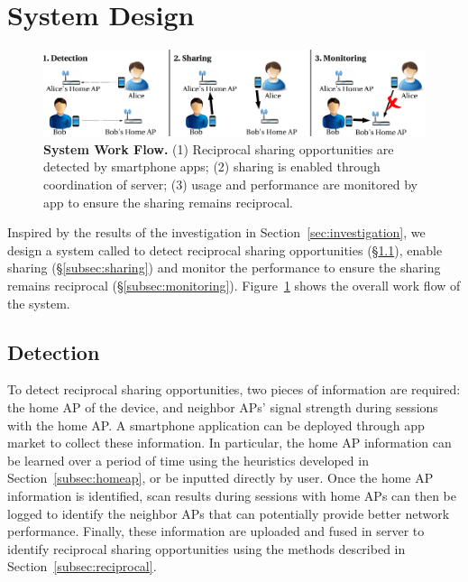 \section{System Design}
\label{sec:design}

\begin{figure}[t]
  \centering
  \includegraphics[width=\textwidth]{./figures/design.pdf}
  \caption{\textbf{\wisefi{} System Work Flow.} (1) Reciprocal sharing
    opportunities are detected by \wisefi{} smartphone apps; (2) \wifi{} sharing
    is enabled through coordination of \wisefi{} server; (3) \wifi{} usage and
    performance are monitored by \wisefi{} app to ensure the sharing remains
  reciprocal.}
  \label{fig:design}
\end{figure}

Inspired by the results of the investigation in Section~\ref{sec:investigation},
we design a system called \wisefi{} to detect reciprocal sharing
opportunities (\S\ref{subsec:detection}), enable \wifi{} sharing
(\S\ref{subsec:sharing}) and monitor the \wifi{} performance to ensure the
sharing remains reciprocal (\S\ref{subsec:monitoring}). Figure~\ref{fig:design}
shows the overall work flow of the \wisefi{} system.

\subsection{Detection}
\label{subsec:detection}

To detect reciprocal sharing opportunities, two pieces of information are
required: the home AP of the device, and neighbor APs' signal strength during
\wifi{} sessions with the home AP. A smartphone application can be deployed
through app market to collect these information. In particular, the home AP
information can be learned over a period of time using the heuristics developed
in Section~\ref{subsec:homeap}, or be inputted directly by user. Once the home
AP information is identified, \wifi{} scan results during sessions with home APs
can then be logged to identify the neighbor APs that can potentially provide
better network performance. Finally, these information are uploaded and fused in
\wisefi{} server to identify reciprocal sharing opportunities using the methods
described in Section~\ref{subsec:reciprocal}.

